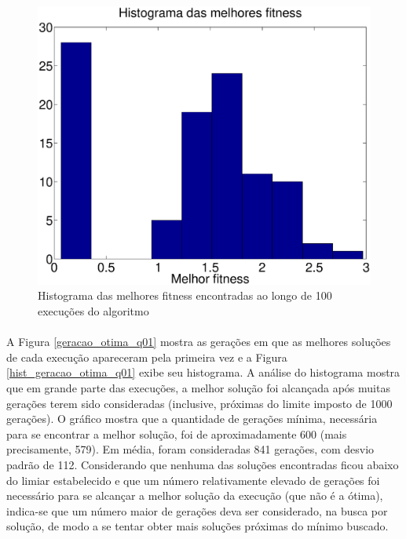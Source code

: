 \documentclass{report}
\begin{document}
\begin{figure}[H]
	\centering
	\includegraphics[width = \textwidth]{Q01_hist_melhores_fitness}
	\caption{Histograma das melhores fitness encontradas ao longo de 100 execuções do algoritmo}
	\label{hist_melhores_fitness_q01}
\end{figure}

\paragraph{} A Figura \ref{geracao_otima_q01} mostra as gerações em que as melhores soluções de cada execução apareceram pela primeira vez e a Figura \ref{hist_geracao_otima_q01} exibe seu histograma. A análise do histograma mostra que em grande parte das execuções, a melhor solução foi alcançada após muitas gerações terem sido consideradas (inclusive, próximas do limite imposto de 1000 gerações). O gráfico mostra que a quantidade de gerações mínima, necessária para se encontrar a melhor solução, foi de aproximadamente 600 (mais precisamente, 579). Em média, foram consideradas 841 gerações, com desvio padrão de 112. Considerando que nenhuma das soluções encontradas ficou abaixo do limiar estabelecido e que um número relativamente elevado de gerações foi necessário para se alcançar a melhor solução da execução (que não é a ótima), indica-se que um número maior de gerações deva ser considerado, na busca por solução, de modo a se tentar obter mais soluções próximas do mínimo buscado.\\
\end{document}
